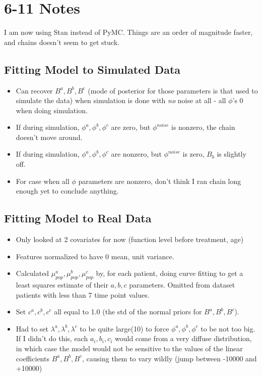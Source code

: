 \section{6-11 Notes}

I am now using Stan instead of PyMC.  Things are an order of magnitude faster, and chains doesn't seem to get stuck.

\subsection{Fitting Model to Simulated Data}
\begin{itemize}
\item Can recover $B^a,B^b,B^c$ (mode of posterior for those parameters is that used to simulate the data) when simulation is done with \emph{no} noise at all - all $\phi$'s 0 when doing simulation.  
\item If during simulation, $\phi^a,\phi^b,\phi^c$ are zero, but $\phi^{noise}$ is nonzero, the chain doesn't move around.
\item If during simulation, $\phi^a,\phi^b,\phi^c$ are nonzero, but $\phi^{noise}$ is zero, $B_b$ is slightly off.
\item For case when all $\phi$ parameters are nonzero, don't think I ran chain long enough yet to conclude anything.
\end{itemize}

\subsection{Fitting Model to Real Data}
\begin{itemize}
\item Only looked at 2 covariates for now (function level before treatment, age)
\item Features normalized to have 0 mean, unit variance.
\item Calculated $\mu_{pop}^a, \mu_{pop}^b, \mu_{pop}^c$ by, for each patient, doing curve fitting to get a least squares estimate of their $a,b,c$ parameters.  Omitted from dataset patients with less than 7 time point values.
\item Set $c^a,c^b,c^c$ all equal to 1.0 (the std of the normal priors for $B^a,B^b,B^c$).
\item Had to set $\lambda^a,\lambda^b,\lambda^c$ to be quite large(10) to force $\phi^a,\phi^b,\phi^c$ to be not too big.  If I didn't do this, each $a_i,b_i,c_i$ would come from a very diffuse distribution, in which case the model would not be sensitive to the values of the linear coefficients $B^a,B^b,B^c$, causing them to vary wildly (jump between -10000 and +10000)
\end{itemize}

